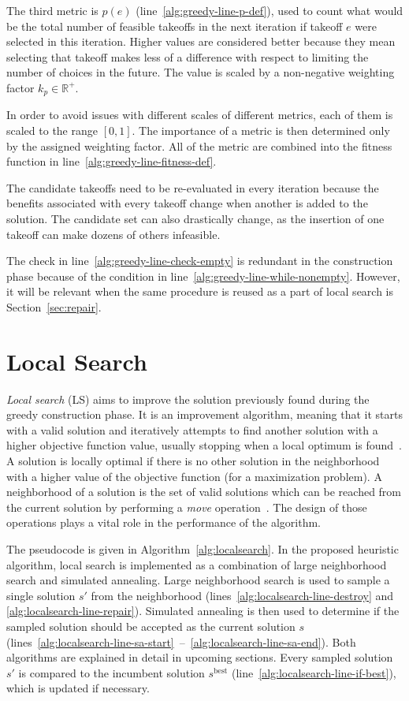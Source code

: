 The third metric is $p(e)$ (line~\ref{alg:greedy-line-p-def}), used to count what would be the total number of feasible takeoffs in the next iteration if takeoff $e$ were selected in this iteration.
Higher values are considered better because they mean selecting that takeoff makes less of a difference with respect to limiting the number of choices in the future.
The value is scaled by a non-negative weighting factor $k_p \in \mathbb{R}^+$.

In order to avoid issues with different scales of different metrics, each of them is scaled to the range $[0, 1]$.
The importance of a metric is then determined only by the assigned weighting factor.
All of the metric are combined into the fitness function in line~\ref{alg:greedy-line-fitness-def}.

The candidate takeoffs need to be re-evaluated in every iteration because the benefits associated with every takeoff change when another is added to the solution.
The candidate set can also drastically change, as the insertion of one takeoff can make dozens of others infeasible.

The check in line~\ref{alg:greedy-line-check-empty} is redundant in the construction phase because of the condition in line~\ref{alg:greedy-line-while-nonempty}.
However, it will be relevant when the same procedure is reused as a part of local search is Section~\ref{sec:repair}.


\section{Local Search}

\textit{Local search} (LS) aims to improve the solution previously found during the greedy construction phase.
It is an improvement algorithm, meaning that it starts with a valid solution and iteratively attempts to find another solution with a higher objective function value, usually stopping when a local optimum is found~\cite{Feo/GraspReview}.
A solution is locally optimal if there is no other solution in the neighborhood with a higher value of the objective function (for a maximization problem).
A neighborhood of a solution is the set of valid solutions which can be reached from the current solution by performing a \textit{move} operation~\cite{Cupic/Metaheuristics}.
The design of those operations plays a vital role in the performance of the algorithm.

The pseudocode is given in Algorithm~\ref{alg:localsearch}.
In the proposed heuristic algorithm, local search is implemented as a combination of large neighborhood search and simulated annealing.
Large neighborhood search is used to sample a single solution $s'$ from the neighborhood (lines~\ref{alg:localsearch-line-destroy} and \ref{alg:localsearch-line-repair}).
Simulated annealing is then used to determine if the sampled solution should be accepted as the current solution $s$ (lines~\ref{alg:localsearch-line-sa-start}~--~\ref{alg:localsearch-line-sa-end}).
Both algorithms are explained in detail in upcoming sections.
Every sampled solution $s'$ is compared to the incumbent solution $s^{\mathrm{best}}$ (line~\ref{alg:localsearch-line-if-best}), which is updated if necessary.

